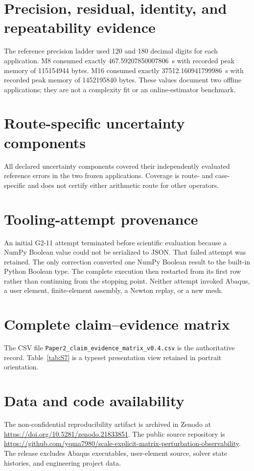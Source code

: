 \documentclass[11pt]{article}
\begin{document}
\section{Precision, residual, identity, and repeatability evidence}
\footnotesize
\setlength{\tabcolsep}{3.2pt}

\normalsize

The reference precision ladder used 120 and 180 decimal digits for each application. M8 consumed exactly 467.59207850007806~s with recorded peak memory of 115154944 bytes. M16 consumed exactly 37512.160941799986~s with recorded peak memory of 1452195840 bytes. These values document two offline applications; they are not a complexity fit or an online-estimator benchmark.

\section{Route-specific uncertainty components}
\footnotesize
\setlength{\tabcolsep}{3.2pt}

\normalsize

All declared uncertainty components covered their independently evaluated reference errors in the two frozen applications. Coverage is route- and case-specific and does not certify either arithmetic route for other operators.

\section{Tooling-attempt provenance}
An initial G2-11 attempt terminated before scientific evaluation because a NumPy Boolean value could not be serialized to JSON. That failed attempt was retained. The only correction converted one NumPy Boolean result to the built-in Python Boolean type. The complete execution then restarted from its first row rather than continuing from the stopping point. Neither attempt invoked Abaqus, a user element, finite-element assembly, a Newton replay, or a new mesh.

\section{Complete claim--evidence matrix}
The CSV file \texttt{Paper2\_claim\_evidence\_matrix\_v0.4.csv} is the authoritative record. Table~\ref{tab:S7} is a typeset presentation view retained in portrait orientation.

\scriptsize
\setlength{\tabcolsep}{2.1pt}

\normalsize

\section*{Data and code availability}
The non-confidential reproducibility artifact is archived in Zenodo at \href{https://doi.org/10.5281/zenodo.21833851}{https://doi.org/10.5281/zenodo.21833851}. The public source repository is \href{https://github.com/yqma7980/scale-explicit-matrix-perturbation-observability}{https://github.com/yqma7980/scale-explicit-matrix-perturbation-observability}. The release excludes Abaqus executables, user-element source, solver state histories, and engineering project data.
\end{document}
